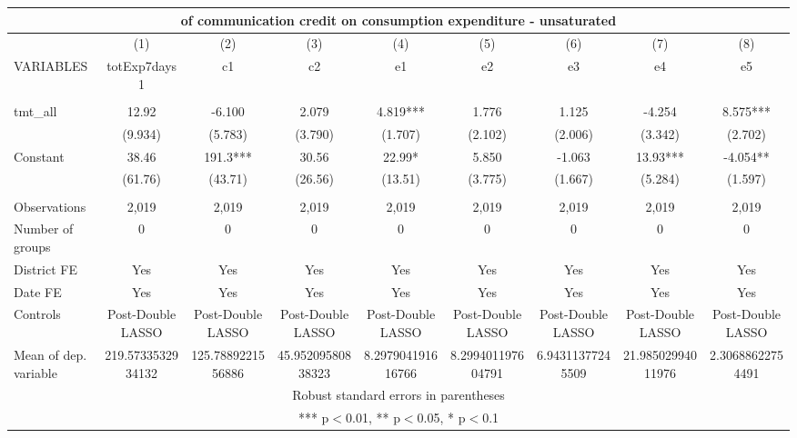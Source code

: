 \documentclass[]{article}
\begin{document}
\begin{tabular}{lcccccccc}
\multicolumn{9}{c}{ of communication credit on consumption expenditure - unsaturated} \\ \hline
 & (1) & (2) & (3) & (4) & (5) & (6) & (7) & (8) \\
VARIABLES & totExp7days1 & c1 & c2 & e1 & e2 & e3 & e4 & e5 \\ \hline
 &  &  &  &  &  &  &  &  \\
tmt\_all & 12.92 & -6.100 & 2.079 & 4.819*** & 1.776 & 1.125 & -4.254 & 8.575*** \\
 & (9.934) & (5.783) & (3.790) & (1.707) & (2.102) & (2.006) & (3.342) & (2.702) \\
Constant & 38.46 & 191.3*** & 30.56 & 22.99* & 5.850 & -1.063 & 13.93*** & -4.054** \\
 & (61.76) & (43.71) & (26.56) & (13.51) & (3.775) & (1.667) & (5.284) & (1.597) \\
 &  &  &  &  &  &  &  &  \\
Observations & 2,019 & 2,019 & 2,019 & 2,019 & 2,019 & 2,019 & 2,019 & 2,019 \\
Number of groups & 0 & 0 & 0 & 0 & 0 & 0 & 0 & 0 \\
District FE & Yes & Yes & Yes & Yes & Yes & Yes & Yes & Yes \\
Date FE & Yes & Yes & Yes & Yes & Yes & Yes & Yes & Yes \\
Controls & Post-Double LASSO & Post-Double LASSO & Post-Double LASSO & Post-Double LASSO & Post-Double LASSO & Post-Double LASSO & Post-Double LASSO & Post-Double LASSO \\
 Mean of dep. variable & 219.5733532934132 & 125.7889221556886 & 45.95209580838323 & 8.297904191616766 & 8.299401197604791 & 6.94311377245509 & 21.98502994011976 & 2.30688622754491 \\ \hline
\multicolumn{9}{c}{ Robust standard errors in parentheses} \\
\multicolumn{9}{c}{ *** p$<$0.01, ** p$<$0.05, * p$<$0.1} \\
\end{tabular}
\end{document}
